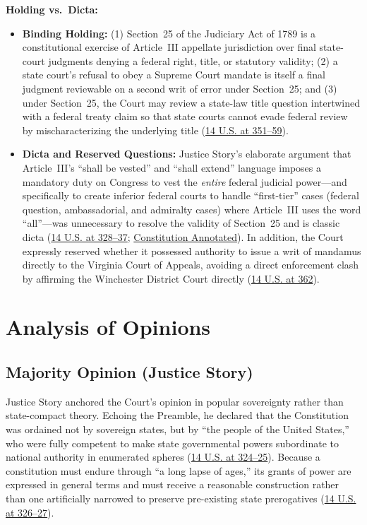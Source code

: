 \documentclass[12pt]{article}
\begin{document}
\textbf{Holding vs.\ Dicta:}
\begin{itemize}
    \item \textbf{Binding Holding:} (1) Section~25 of the Judiciary Act of 1789 is a constitutional exercise of Article~III appellate jurisdiction over final state-court judgments denying a federal right, title, or statutory validity; (2) a state court's refusal to obey a Supreme Court mandate is itself a final judgment reviewable on a second writ of error under Section~25; and (3) under Section~25, the Court may review a state-law title question intertwined with a federal treaty claim so that state courts cannot evade federal review by mischaracterizing the underlying title (\href{https://supreme.justia.com/cases/federal/us/14/304/}{14 U.S. at 351--59}).
    \item \textbf{Dicta and Reserved Questions:} Justice Story's elaborate argument that Article~III's ``shall be vested'' and ``shall extend'' language imposes a mandatory duty on Congress to vest the \textit{entire} federal judicial power---and specifically to create inferior federal courts to handle ``first-tier'' cases (federal question, ambassadorial, and admiralty cases) where Article~III uses the word ``all''---was unnecessary to resolve the validity of Section~25 and is classic dicta (\href{https://supreme.justia.com/cases/federal/us/14/304/}{14 U.S. at 328--37}; \href{https://constitution.congress.gov/browse/essay/artIII-S1-1/ALDE_00013512/}{Constitution Annotated}). In addition, the Court expressly reserved whether it possessed authority to issue a writ of mandamus directly to the Virginia Court of Appeals, avoiding a direct enforcement clash by affirming the Winchester District Court directly (\href{https://supreme.justia.com/cases/federal/us/14/304/}{14 U.S. at 362}).
\end{itemize}

\section{Analysis of Opinions}

\subsection{Majority Opinion (Justice Story)}

Justice Story anchored the Court's opinion in popular sovereignty rather than state-compact theory. Echoing the Preamble, he declared that the Constitution was ordained not by sovereign states, but by ``the people of the United States,'' who were fully competent to make state governmental powers subordinate to national authority in enumerated spheres (\href{https://supreme.justia.com/cases/federal/us/14/304/}{14 U.S. at 324--25}). Because a constitution must endure through ``a long lapse of ages,'' its grants of power are expressed in general terms and must receive a reasonable construction rather than one artificially narrowed to preserve pre-existing state prerogatives (\href{https://supreme.justia.com/cases/federal/us/14/304/}{14 U.S. at 326--27}).
\end{document}

